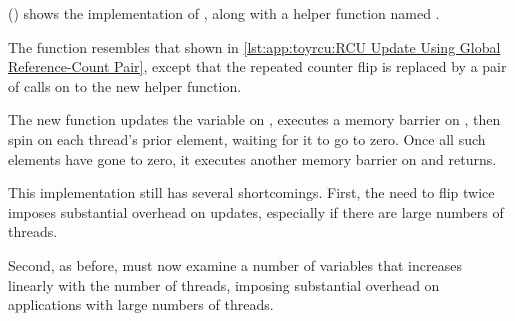 \begin{listing}

\caption{RCU Per-Thread Reference-Count Pair Data}
\label{lst:app:toyrcu:RCU Per-Thread Reference-Count Pair Data}
\end{listing}

\begin{listing}

\caption{RCU Read-Side Using Per-Thread Reference-Count Pair}
\label{lst:app:toyrcu:RCU Read-Side Using Per-Thread Reference-Count Pair}
\end{listing}

\begin{listing}

\caption{RCU Update Using Per-Thread Reference-Count Pair}
\label{lst:app:toyrcu:RCU Update Using Per-Thread Reference-Count Pair}
\end{listing}

()
shows the implementation of , along with a helper
function named .
\begin{fcvref}
The  function resembles that shown in
\cref{lst:app:toyrcu:RCU Update Using Global Reference-Count Pair},
except that the repeated counter flip is replaced by a pair of calls
on  to the new helper function.
\end{fcvref}

\begin{fcvref}
The new  function updates the
 variable on ,
executes a memory barrier on ,
then 
spin on each thread's prior  element,
waiting for it to go to zero.
Once all such elements have gone to zero,
it executes another memory barrier on  and returns.
\end{fcvref}

This implementation still has several shortcomings.
First, the need to flip  twice imposes substantial overhead
on updates, especially if there are large numbers of threads.

Second, as before,  must now examine a number of
variables that increases linearly with the number of threads, imposing
substantial overhead on applications with large numbers of threads.

